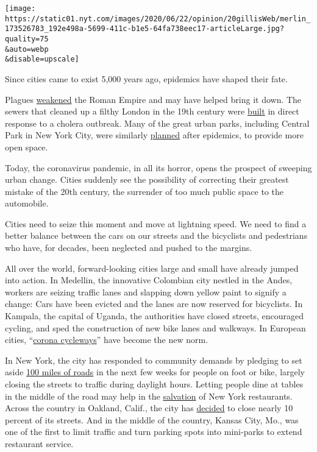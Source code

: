 \texttt{[image: https://static01.nyt.com/images/2020/06/22/opinion/20gillisWeb/merlin\_173526783\_192e498a-5699-411c-b1e5-64fa738eec17-articleLarge.jpg?quality=75\\\&auto=webp\\\&disable=upscale]}

Since cities came to exist 5,000 years ago, epidemics have shaped their
fate.

Plagues
\href{https://www.theatlantic.com/science/archive/2016/03/plagues-roman-empire/473862/}{weakened}
the Roman Empire and may have helped bring it down. The sewers that
cleaned up a filthy London in the 19th century were
\href{http://www.bbc.co.uk/history/historic_figures/bazalgette_joseph.shtml}{built}
in direct response to a cholera outbreak. Many of the great urban parks,
including Central Park in New York City, were similarly
\href{https://www.history.com/news/cholera-pandemic-new-york-city-london-paris-green-space}{planned}
after epidemics, to provide more open space.

Today, the coronavirus pandemic, in all its horror, opens the prospect
of sweeping urban change. Cities suddenly see the possibility of
correcting their greatest mistake of the 20th century, the surrender of
too much public space to the automobile.

Cities need to seize this moment and move at lightning speed. We need to
find a better balance between the cars on our streets and the bicyclists
and pedestrians who have, for decades, been neglected and pushed to the
margins.

All over the world, forward-looking cities large and small have already
jumped into action. In Medellin, the innovative Colombian city nestled
in the Andes, workers are seizing traffic lanes and slapping down yellow
paint to signify a change: Cars have been evicted and the lanes are now
reserved for bicyclists. In Kampala, the capital of Uganda, the
authorities have closed streets, encouraged cycling, and sped the
construction of new bike lanes and walkways. In European cities,
``\href{https://www.nytimes.com/2020/06/12/business/paris-bicycles-commute-coronavirus.htmlhttps:/www.nytimes.com/2020/06/12/business/paris-bicycles-commute-coronavirus.html}{corona
cycleways}'' have become the new norm.

In New York, the city has responded to community demands by pledging to
set aside
\href{https://nyc.streetsblog.org/2020/04/27/breaking-de-blasio-commits-to-100-miles-of-open-streets/}{100
miles of roads} in the next few weeks for people on foot or bike,
largely closing the streets to traffic during daylight hours. Letting
people dine at tables in the middle of the road may help in the
\href{https://www.timeout.com/newyork/news/this-is-what-outdoor-dining-may-soon-look-like-in-nyc-052920}{salvation}
of New York restaurants. Across the country in Oakland, Calif., the city
has
\href{https://www.curbed.com/2020/5/19/21258662/oakland-slow-streets-closures-social-distancing}{decided}
to close nearly 10 percent of its streets. And in the middle of the
country, Kansas City, Mo., was one of the first to limit traffic and
turn parking spots into mini-parks to extend restaurant service.

